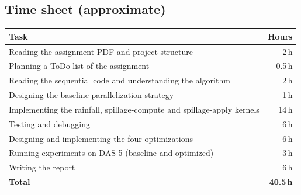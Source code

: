 \documentclass[sigconf, nonacm, review]{acmart}
\begin{document}
\subsection*{Time sheet (approximate)}
\begin{table}[h]
  \centering
  \small
  \begin{tabular}{p{}r}
    \toprule
    Task & Hours \\
    \midrule
    Reading the assignment PDF and project structure & 2\,h \\
    Planning a ToDo list of the assignment & 0.5\,h \\
    Reading the sequential code and understanding the algorithm & 2\,h \\
    Designing the baseline parallelization strategy & 1\,h \\
    Implementing the rainfall, spillage-compute and spillage-apply kernels & 14\,h \\
    Testing and debugging  & 6\,h \\
    Designing and implementing the four optimizations & 6\,h \\
    Running experiments on DAS-5 (baseline and optimized) & 3\,h \\
    Writing the report & 6\,h \\
    \midrule
    \textbf{Total} & \textbf{40.5\,h} \\
    \bottomrule
  \end{tabular}
\end{table}



\end{document}
